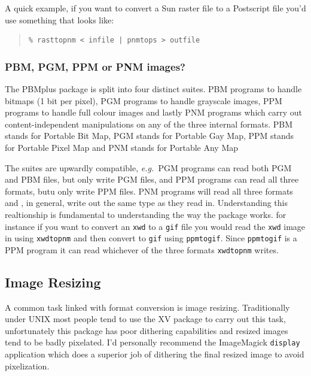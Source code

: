 \documentclass[twoside,11pt]{article}
\newcommand{\htmlref}[2]{#1}
\newcommand{\xlabel}[1]{}
\begin{document}
A quick example, if you want to convert a Sun raster file to a Postscript file you'd use something that looks like:

\small
\begin{quote}
\begin{verbatim}
% rasttopnm < infile | pnmtops > outfile 
\end{verbatim}
\end{quote}
\normalsize

\subsubsection{PBM, PGM, PPM or PNM images?}

The PBMplus package is split into four distinct suites. PBM programs to handle bitmaps (1 bit per pixel), PGM programs to handle grayscale images, PPM programs to handle full colour images and lastly PNM programs which carry out content-independent manipulations on any of the three internal formats. PBM stands for Portable Bit Map, PGM stands for Portable Gay Map, PPM stands for Portable Pixel Map and PNM stands for Portable Any Map

The suites are upwardly compatible, {\em e.g.\ }PGM programs can read both PGM and PBM files, but only write PGM files, and PPM programs can read all three formats, butu only write PPM files. PNM programs will read all three formats and , in general, write out the same type as they read in. Understanding this realtionship is fundamental to understanding the way the package works. for instance if you want to convert  an {\tt xwd} to a {\tt gif} file you would read the {\tt xwd} image in using {\tt xwdtopnm} and then convert to {\tt gif} using {\tt ppmtogif}. Since {\tt ppmtogif} is a PPM program it can read whichever of the three formats {\tt xwdtopnm} writes.

\subsection{\xlabel{sc15_resizing}Image Resizing\label{sc15_resizing}}

A common task linked with format conversion is image resizing. Traditionally under UNIX most people tend to use the \htmlref{XV}{sc15_xv} package to carry out this task, unfortunately this package has poor dithering capabilities and resized images tend to be badly pixelated. I'd personally recommend the \htmlref{ImageMagick}{sc15_magick} {\tt display} application which does a superior job of dithering the final resized image to avoid pixelization.
\end{document}
